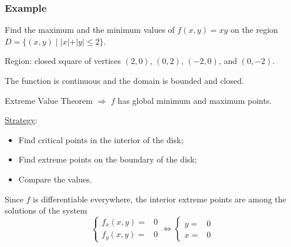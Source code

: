 \begin{frame}
  \frametitle{Example}

Find the maximum and the minimum values of $f(x,y) = xy$ on the region $D = \{ (x,y) \; | \; |x|+|y| \leqslant 2 \}$.
\pause

Region: \pause closed square of vertices $(2,0)$, $(0,2)$, $(-2,0)$, and $(0,-2)$.

\pause

The function is continuous and the domain is bounded and closed.

Extreme Value Theorem $\Longrightarrow$ $f$ has global minimum and maximum points.

\pause
\underline{Strategy}:
%
\begin{itemize}
  \item Find critical points in the interior of the disk;
  \item Find extreme points on the boundary of the disk;
  \item Compare the values.
\end{itemize}

\pause
Since $f$ is differentiable everywhere, the interior extreme points are among the solutions of the system
%
$$\left\{
\begin{array}{ll}
  f_x(x,y) = &  0 \\
  f_y(x,y) = &  0
\end{array}
\right.
%
\Longleftrightarrow
%
\left\{
\begin{array}{ll}
  y = &  0 \\
  x= &  0
\end{array}
\right.
$$
\end{frame}

